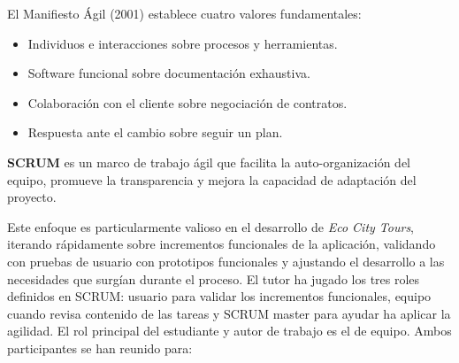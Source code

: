 El Manifiesto Ágil (2001) establece cuatro valores fundamentales:
\begin{itemize}
\item Individuos e interacciones sobre procesos y herramientas.
\item Software funcional sobre documentación exhaustiva.
\item Colaboración con el cliente sobre negociación de contratos.
\item Respuesta ante el cambio sobre seguir un plan.
\end{itemize}

\textbf{SCRUM} es un marco de trabajo ágil que facilita la auto-organización del equipo, promueve la transparencia y mejora la capacidad de adaptación del proyecto.

Este enfoque es particularmente valioso en el desarrollo de \textit{Eco City Tours}, iterando rápidamente sobre incrementos funcionales de la aplicación, validando con pruebas de usuario con prototipos funcionales y ajustando el desarrollo a las necesidades que surgían durante el proceso. El tutor ha jugado los tres roles definidos en SCRUM: usuario para validar los incrementos funcionales, equipo cuando revisa contenido de las tareas y SCRUM master para ayudar ha aplicar la agilidad. El rol principal del estudiante y autor de trabajo es el de equipo. Ambos participantes se han reunido para:

